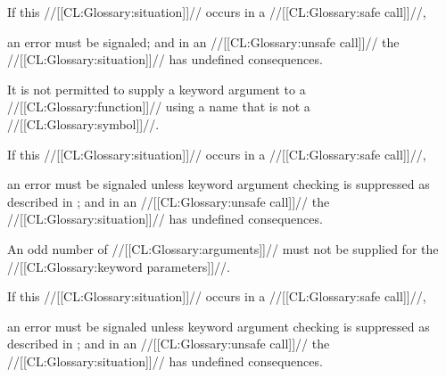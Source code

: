 
If this //[[CL:Glossary:situation]]// occurs in a //[[CL:Glossary:safe call]]//,

an error  must be signaled; and in an //[[CL:Glossary:unsafe call]]// the //[[CL:Glossary:situation]]// has undefined consequences.


\endsubsubsection%

 

It is not permitted to supply a keyword argument to a //[[CL:Glossary:function]]// using a name that is not a //[[CL:Glossary:symbol]]//.


If this //[[CL:Glossary:situation]]// occurs in a //[[CL:Glossary:safe call]]//,

an error  must be signaled  unless keyword argument checking is suppressed as described in \secref\SuppressingKeyArgChecks; and in an //[[CL:Glossary:unsafe call]]// the //[[CL:Glossary:situation]]// has undefined consequences.


\endsubsubsection%

 


An odd number of //[[CL:Glossary:arguments]]// must not be supplied for the //[[CL:Glossary:keyword parameters]]//.


If this //[[CL:Glossary:situation]]// occurs in a //[[CL:Glossary:safe call]]//,

an error  must be signaled unless keyword argument checking is suppressed as described in \secref\SuppressingKeyArgChecks; and in an //[[CL:Glossary:unsafe call]]// the //[[CL:Glossary:situation]]// has undefined consequences.


\endsubsubsection%

 


